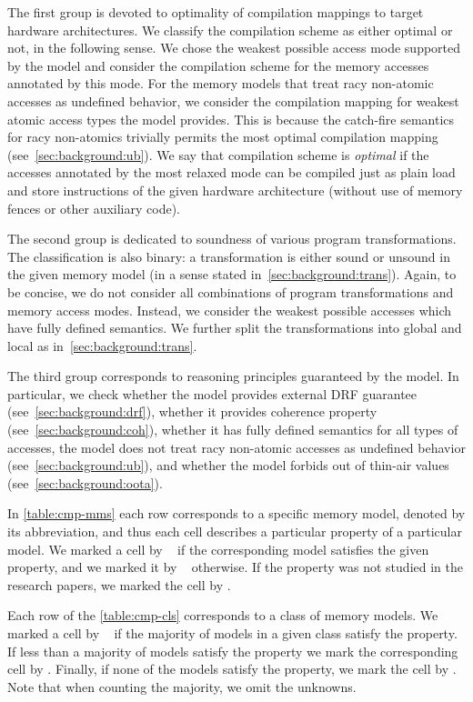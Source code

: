 The first group is devoted to optimality of compilation mappings
to target hardware architectures. We 
classify the compilation scheme as either optimal or not,
in the following sense.
We chose the weakest possible access mode supported by the model
and consider the compilation scheme for the memory accesses annotated by this mode. 
For the memory models that treat racy non-atomic accesses
as undefined behavior, we consider the compilation mapping
for weakest atomic access types the model provides.
This is because the catch-fire semantics for racy non-atomics 
trivially permits the most optimal compilation mapping (see~\cref{sec:background:ub}).
We say that compilation scheme is \emph{optimal} if the 
accesses annotated by the most relaxed mode 
can be compiled just as plain load and store instructions 
of the given hardware architecture 
(\ie without use of memory fences or other auxiliary code). 

The second group is dedicated to soundness of various program transformations. 
The classification is also binary: a transformation is either sound or unsound 
in the given memory model (in a sense stated in~\cref{sec:background:trans}).
Again, to be concise, we do not consider all combinations 
of program transformations and memory access modes. 
Instead, we consider the weakest possible accesses which have fully defined semantics. 
We further split the transformations into global and local as in~\cref{sec:background:trans}.

The third group corresponds to reasoning 
principles guaranteed by the model. In particular, we check 
whether the model provides external DRF guarantee (see~\cref{sec:background:drf}), 
whether it provides coherence property (see~\cref{sec:background:coh}),
whether it has fully defined semantics for all types of accesses, 
\ie the model does not treat racy non-atomic accesses as undefined behavior (see~\cref{sec:background:ub}),
and whether the model forbids out of thin-air values (see~\cref{sec:background:oota}).

In \cref{table:cmp-mms} each row corresponds to 
a specific memory model, denoted by its abbreviation, 
and thus each cell describes a particular property of a particular model. 
We marked a cell by \cmark~ if the corresponding model satisfies the given property,
and we marked it by \xmark~ otherwise.
If the property was not studied in the research papers, we marked the cell by \qmark.

Each row of the \cref{table:cmp-cls} corresponds to a class of memory models.
We marked a cell by \cmark~ if the majority of models in a given class satisfy the property. 
If less than a majority of models satisfy the property we mark 
the corresponding cell by \wmark.
Finally, if none of the models satisfy the property, we mark the cell by \xmark. 
Note that when counting the majority, we omit the unknowns.  

